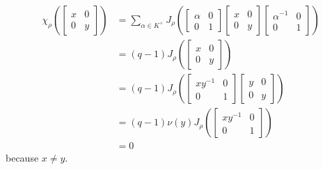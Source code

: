 \documentclass[../main.tex]{subfiles}
\begin{document}
\begin{align*}
	\chi_\rho\left(\begin{bmatrix}
		x & 0 \\
		0 & y
	\end{bmatrix}\right) &= \sum_{\alpha\in K^\times}J_\rho\left(\begin{bmatrix}
		\alpha & 0 \\
		0 & 1
	\end{bmatrix}\begin{bmatrix}
		x & 0 \\
		0 & y
	\end{bmatrix}\begin{bmatrix}
		\alpha^{-1} & 0 \\
		0 & 1
	\end{bmatrix}\right) \\
	&= (q-1)J_\rho\left(\begin{bmatrix}
		x & 0 \\
		0 & y
	\end{bmatrix}\right) \\
	&= (q-1)J_\rho\left(\begin{bmatrix}
		xy^{-1} & 0 \\
		0 & 1
	\end{bmatrix}\begin{bmatrix}
		y & 0 \\
		0 & y
	\end{bmatrix}\right) \\
	&= (q-1)\nu(y)J_\rho\left(\begin{bmatrix}
		xy^{-1} & 0 \\
		0 & 1
	\end{bmatrix}\right) \\
	&= 0
\end{align*}
because $x\ne y$.
\end{document}
